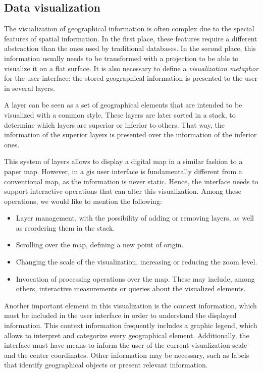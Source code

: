     \subsection{Data visualization}
    The visualization of geographical information is often complex due to the special features of spatial information. In the first place, these features require a different abstraction than the ones used by traditional databases. In the second place, this information usually needs to be transformed with a projection to be able to visualize it on a flat surface. It is also necessary to define a \textit{visualization metaphor} for the user interface: the stored geographical information is presented to the user in several layers.
    
    A layer can be seen as a set of geographical elements that are intended to be visualized with a common style. These layers are later sorted in a stack, to determine which layers are superior or inferior to others. That way, the information of the superior layers is presented over the information of the inferior ones.
    
    This system of layers allows to display a digital map in a similar fashion to a paper map. However, in a \gls{gis} user interface is fundamentally different from a conventional map, as the information is never static. Hence, the interface needs to support interactive operations that can alter this visualization. Among these operations, we would like to mention the following:
    
    \begin{itemize}
        \item Layer management, with the possibility of adding or removing layers, as well as reordering them in the stack.
        \item Scrolling over the map, defining a new point of origin.
        \item Changing the scale of the visualization, increasing or reducing the zoom level.
        \item Invocation of processing operations over the map. These may include, among others, interactive measurements or queries about the visualized elements.
    \end{itemize}
    
    Another important element in this visualization is the context information, which must be included in the user interface in order to understand the displayed information. This context information frequently includes a graphic legend, which allows to interpret and categorize every geographical element. Additionally, the interface must have means to inform the user of the current visualization scale and the center coordinates. Other information may be necessary, such as labels that identify geographical objects or present relevant information.
    
